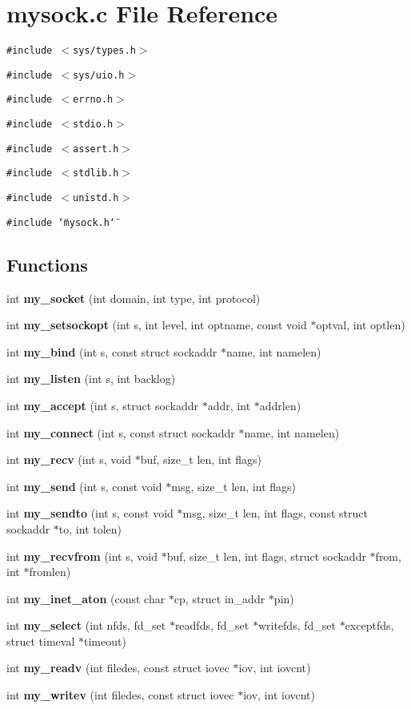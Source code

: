 \section{mysock.c File Reference}
\label{mysock_8c}
{\tt \#include $<$sys/types.h$>$}\par
{\tt \#include $<$sys/uio.h$>$}\par
{\tt \#include $<$errno.h$>$}\par
{\tt \#include $<$stdio.h$>$}\par
{\tt \#include $<$assert.h$>$}\par
{\tt \#include $<$stdlib.h$>$}\par
{\tt \#include $<$unistd.h$>$}\par
{\tt \#include \char`\"{}mysock.h\char`\"{}}\par
\subsection*{Functions}
\begin{CompactItemize}
\item 
int {\bf my\_\-socket} (int domain, int type, int protocol)
\item 
int {\bf my\_\-setsockopt} (int s, int level, int optname, const void $\ast$optval, int optlen)
\item 
int {\bf my\_\-bind} (int s, const struct sockaddr $\ast$name, int namelen)
\item 
int {\bf my\_\-listen} (int s, int backlog)
\item 
int {\bf my\_\-accept} (int s, struct sockaddr $\ast$addr, int $\ast$addrlen)
\item 
int {\bf my\_\-connect} (int s, const struct sockaddr $\ast$name, int namelen)
\item 
int {\bf my\_\-recv} (int s, void $\ast$buf, size\_\-t len, int flags)
\item 
int {\bf my\_\-send} (int s, const void $\ast$msg, size\_\-t len, int flags)
\item 
int {\bf my\_\-sendto} (int s, const void $\ast$msg, size\_\-t len, int flags, const struct sockaddr $\ast$to, int tolen)
\item 
int {\bf my\_\-recvfrom} (int s, void $\ast$buf, size\_\-t len, int flags, struct sockaddr $\ast$from, int $\ast$fromlen)
\item 
int {\bf my\_\-inet\_\-aton} (const char $\ast$cp, struct in\_\-addr $\ast$pin)
\item 
int {\bf my\_\-select} (int nfds, fd\_\-set $\ast$readfds, fd\_\-set $\ast$writefds, fd\_\-set $\ast$exceptfds, struct timeval $\ast$timeout)
\item 
int {\bf my\_\-readv} (int filedes, const struct iovec $\ast$iov, int iovcnt)
\item 
int {\bf my\_\-writev} (int filedes, const struct iovec $\ast$iov, int iovcnt)
\end{CompactItemize}


